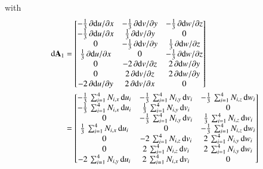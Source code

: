 with
\begin{subequations}
	\begin{align}
    \mathrm{d} \mathbf{A}_1 & =  \begin{bmatrix}
    	-\tfrac{1}{3} \, \partial  \mathrm{d} u / \partial x &  - \tfrac{1}{3} \, \partial  \mathrm{d} v / \partial y & -\tfrac{1}{3} \, \partial  \mathrm{d} w / \partial z  \\
    	-\tfrac{1}{3} \, \partial  \mathrm{d} u / \partial x &  \tfrac{1}{3} \, \partial  \mathrm{d} v / \partial y & 0  \\
    	0  & -\tfrac{1}{3} \, \partial  \mathrm{d} v / \partial y & \tfrac{1}{3} \, \partial  \mathrm{d} w / \partial z \\
    	\tfrac{1}{3} \, \partial  \mathrm{d} u / \partial x &  0 & - \tfrac{1}{3} \, \partial  \mathrm{d} w / \partial z  \\
    	0 &  - 2 \, \partial  \mathrm{d} v / \partial z &  2 \,  \partial  \mathrm{d} w / \partial y  \\
    	0 &  2 \, \partial  \mathrm{d} v / \partial z  & 2 \,  \partial  \mathrm{d} w / \partial y  \\
    	- 2 \, \partial  \mathrm{d} u / \partial y &   2 \, \partial  \mathrm{d} v / \partial x & 0   \end{bmatrix} \notag\\
	& = \begin{bmatrix} 
	-\tfrac{1}{3} \, \sum\nolimits_{i=1}^4 N_{i,x} \, \mathrm{d} u_i &  - \tfrac{1}{3} \, \sum\nolimits_{i=1}^4 N_{i,y} \, \mathrm{d} v_i & - \tfrac{1}{3} \, \sum\nolimits_{i=1}^4 N_{i,z} \, \mathrm{d} w_i  \\
	-\tfrac{1}{3} \, \sum\nolimits_{i=1}^4 N_{i,x} \, \mathrm{d} u_i &  \tfrac{1}{3} \, \sum\nolimits_{i=1}^4 N_{i,y} \, \mathrm{d} v_i & 0  \\
	0 & -\tfrac{1}{3} \, \sum\nolimits_{i=1}^4 N_{i,y} \, \mathrm{d} v_i & \tfrac{1}{3} \, \sum\nolimits_{i=1}^4 N_{i,z} \, \mathrm{d} w_i \\
	\tfrac{1}{3} \, \sum\nolimits_{i=1}^4 N_{i,x} \, \mathrm{d} u_i &  0 & - \tfrac{1}{3} \, \sum\nolimits_{i=1}^4 N_{i,z} \, \mathrm{d} w_i  \\
	0 &  - 2 \, \sum\nolimits_{i=1}^4 N_{i,z} \, \mathrm{d} v_i & 2 \,  \sum\nolimits_{i=1}^4 N_{i,y} \, \mathrm{d} w_i  \\
	0 & 2 \, \sum\nolimits_{i=1}^4 N_{i,z} \, \mathrm{d} v_i & 2 \,  \sum\nolimits_{i=1}^4 N_{i,y} \, \mathrm{d} w_i  \\
	- 2 \, \sum\nolimits_{i=1}^4 N_{i,y} \, \mathrm{d} u_i &  2 \, \sum\nolimits_{i=1}^4 N_{i,x} \, \mathrm{d} v_i & 0   \end{bmatrix} \notag \\	

\end{align}
\end{subequations}
